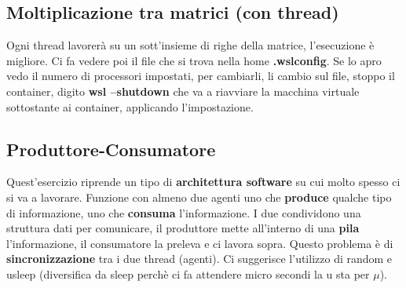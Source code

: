 \documentclass{article}
\begin{document}
\subsection{Moltiplicazione tra matrici (con thread)}
Ogni thread lavorerà su un sott'insieme di righe della matrice, l'esecuzione è migliore. Ci fa vedere poi il file che si trova nella home \textbf{.wslconfig}. Se lo apro vedo il numero di processori impostati, per cambiarli, li cambio sul file, stoppo il container, digito \textbf{wsl --shutdown} che va a riavviare la macchina virtuale sottostante ai container, applicando l'impostazione.
\subsection{Produttore-Consumatore}
Quest'esercizio riprende un tipo di \textbf{architettura software} su cui molto spesso ci si va a lavorare. Funzione con almeno due agenti uno che \textbf{produce} qualche tipo di informazione, uno che \textbf{consuma} l'informazione. I due condividono una struttura dati per comunicare, il produttore mette all'interno di una \textbf{pila} l'informazione, il consumatore la preleva e ci lavora sopra. Questo problema è di \textbf{sincronizzazione} tra i due thread (agenti). Ci suggerisce l'utilizzo di random e usleep (diversifica da sleep perchè ci fa attendere micro secondi la u sta per $\mu$).
\end{document}
